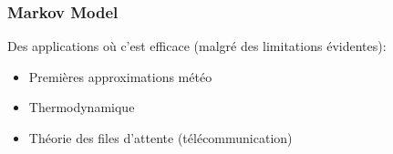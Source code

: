 \begin{frame}
  \frametitle{Markov Model}
  Des applications où c'est efficace (malgré des limitations évidentes):
  \begin{itemize}
  \item Premières approximations météo
  \item Thermodynamique
  \item Théorie des files d'attente (télécommunication)
  \end{itemize}
\end{frame}
